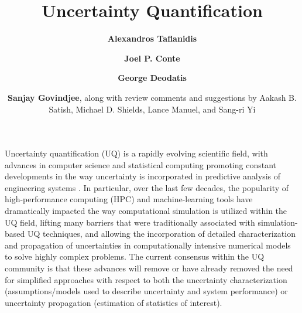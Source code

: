 %
%
%


\title{Uncertainty Quantification}
\author{
    \textbf{Alexandros Taflanidis}
    \and \textbf{Joel P. Conte}
    \and \textbf{George Deodatis}
    \and \textbf{Sanjay Govindjee},
    \newline
    along with review comments and suggestions by Aakash B. Satish, Michael D. Shields, Lance Manuel, and Sang-ri Yi
    }
\tocauthor{}
%
%
\maketitle
\label{chapter:uq}

Uncertainty quantification (UQ) is a rapidly evolving scientific field, with advances in computer science and statistical computing promoting constant developments in the way uncertainty is incorporated in predictive analysis of engineering systems \citep{smith2013uncertainty}. In particular, over the last few decades, the popularity of high-performance computing (HPC) and machine-learning tools have dramatically impacted the way computational simulation is utilized within the UQ field, lifting many barriers that were traditionally associated with simulation-based UQ techniques, and allowing the incorporation of detailed characterization and propagation of uncertainties in computationally intensive numerical models to solve highly complex problems. The current consensus within the UQ community is that these advances will remove or have already removed the need for simplified approaches with respect to both the uncertainty characterization (assumptions/models used to describe uncertainty and system performance) or uncertainty propagation (estimation of statistics of interest). 

